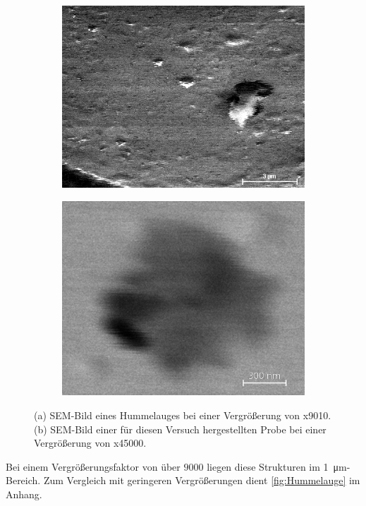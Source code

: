 	\begin{figure}[ht]
		\centering
		\begin{subfigure}[c]{.45\textwidth}
			\centering
			\includegraphics[width=.8\textwidth]{raw/SEM/Hummelauge_M9010}
			\subcaption{}
			\label{fig:Hummelaugex9010}
		\end{subfigure}
		\begin{subfigure}[c]{.45\textwidth}
			\centering
			\includegraphics[width=.8\textwidth]{raw/SEM/45kresolutionExt2.png}
			\subcaption{}
			\label{fig:45k}
		\end{subfigure}
		\caption{(a) SEM-Bild eines Hummelauges bei einer Vergrößerung von x9010.\\
		(b) SEM-Bild einer für diesen Versuch hergestellten Probe bei einer Vergrößerung von x45000.
		}
		\label{fig:resolution}
	\end{figure}
	Bei einem Vergrößerungsfaktor von über $9000$ liegen diese Strukturen im \SI{1}{\micro\meter}-Bereich.
	Zum Vergleich mit geringeren Vergrößerungen dient \cref{fig:Hummelauge} im Anhang.

